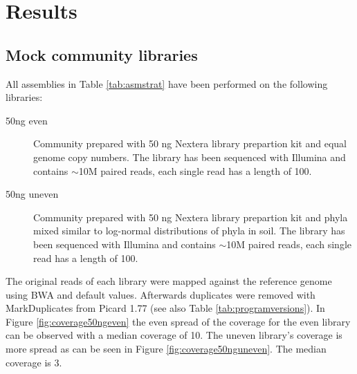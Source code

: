 \documentclass[a4paper,12pt]{report}
\begin{document}
\chapter{Results}

\section{Mock community libraries}
All assemblies in Table \ref{tab:asmstrat} have been performed on the
following libraries:
\begin{description}
\item[50ng even] Community prepared with 50 ng Nextera library prepartion kit and equal
genome copy numbers. The library has been sequenced with Illumina and contains
$\sim$10M paired reads, each single read has a length of 100.
\item[50ng uneven] Community prepared with 50 ng Nextera library prepartion kit
and phyla mixed similar to log-normal distributions of phyla in soil. The
library has been sequenced with Illumina and contains $\sim$10M paired reads,
each single read has a length of 100.
\end{description}

The original reads of each library were mapped against the reference genome
using BWA \cite{Li20080505} and default values. Afterwards duplicates were
removed with MarkDuplicates from Picard 1.77 (see also Table
\ref{tab:programversions}). In Figure \ref{fig:coverage50ngeven} the even
spread of the coverage for the even library can be observed with a median
coverage of 10. The uneven library's coverage is more spread as can be seen in
Figure \ref{fig:coverage50nguneven}. The median coverage is 3.\\
\end{document}
